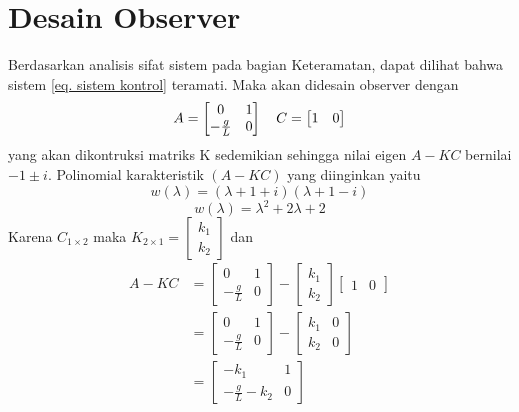 \documentclass{article}
\begin{document}
\section{Desain Observer}
Berdasarkan analisis sifat sistem pada bagian Keteramatan, dapat dilihat bahwa sistem \eqref{eq. sistem kontrol} teramati. Maka akan didesain observer dengan
\begin{equation*}
    A = \begin{bmatrix} 0 & 1 \\ -\frac{g}{L} & 0 \end{bmatrix} \\
    \quad C= \begin{bmatrix}
        1 & 0
    \end{bmatrix}
\end{equation*}
yang akan dikontruksi matriks K sedemikian sehingga nilai eigen $A-KC$ bernilai $-1 \pm i$.
Polinomial karakteristik $(A-KC)$ yang diinginkan yaitu
\[ w(\lambda) = (\lambda+1+i)(\lambda+1-i) \]
\[w(\lambda) = {\lambda}^2+2\lambda+2\]
Karena $C_{1 \times 2}$ maka $K_{2 \times 1} = \begin{bmatrix}
        k_1 \\ k_2
    \end{bmatrix}$ dan
\begin{align*}
    A-KC & =
    \begin{bmatrix}
        0 & 1 \\ -\frac{g}{L} & 0
    \end{bmatrix} -
    \begin{bmatrix}
        k_1 \\ k_2
    \end{bmatrix}
    \begin{bmatrix}
        1 & 0
    \end{bmatrix}                             \\
         & = \begin{bmatrix}
                 0 & 1 \\ -\frac{g}{L} & 0
             \end{bmatrix} -
    \begin{bmatrix}
        k_1 & 0 \\ k_2 & 0
    \end{bmatrix}                          \\
         & = \begin{bmatrix}
                 -k_1 & 1 \\ -\frac{g}{L} - k_2 & 0
             \end{bmatrix}
\end{align*}
\end{document}
